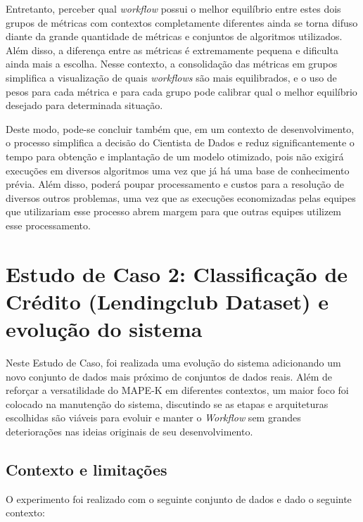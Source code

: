 \documentclass[portugues]{ic-tese}
\begin{document}
Entretanto, perceber qual \textit{workflow} possui o melhor equilíbrio entre estes dois grupos de métricas com contextos completamente diferentes ainda se torna difuso diante da grande quantidade de métricas e conjuntos de algoritmos utilizados. Além disso, a diferença entre as métricas é extremamente pequena e dificulta ainda mais a escolha. Nesse contexto, a consolidação das métricas em grupos simplifica a visualização de quais \textit{workflows} são mais equilibrados, e o uso de pesos para cada métrica e para cada grupo pode calibrar qual o melhor equilíbrio desejado para determinada situação.

Deste modo, pode-se concluir também que, em um contexto de desenvolvimento, o processo simplifica a decisão do Cientista de Dados e reduz significantemente o tempo para obtenção e implantação de um modelo otimizado, pois não exigirá execuções em diversos algoritmos uma vez que já há uma base de conhecimento prévia. Além disso, poderá poupar processamento e custos para a resolução de diversos outros problemas, uma vez que as execuções economizadas pelas equipes que utilizariam esse processo abrem margem para que outras equipes utilizem esse processamento.

\chapter{Estudo de Caso 2: Classificação de Crédito (Lendingclub Dataset) e evolução do sistema}

Neste Estudo de Caso, foi realizada uma evolução do sistema adicionando um novo conjunto de dados mais próximo de conjuntos de dados reais. Além de reforçar a versatilidade do MAPE-K em diferentes contextos, um maior foco foi colocado na manutenção do sistema, discutindo se as etapas e arquiteturas escolhidas são viáveis para evoluir e manter o \textit{Workflow} sem grandes deteriorações nas ideias originais de seu desenvolvimento.

\section{Contexto e limitações}

O experimento foi realizado com o seguinte conjunto de dados e dado o seguinte contexto:
\end{document}
